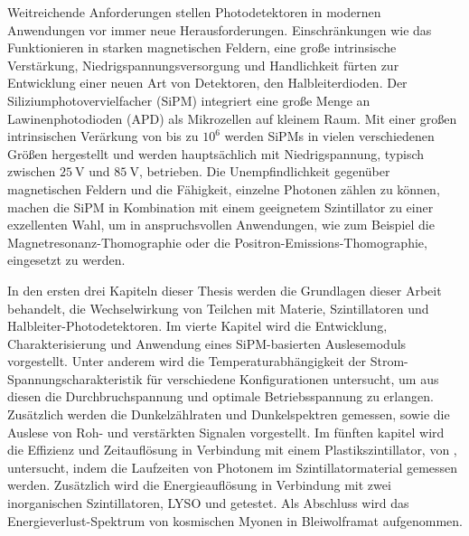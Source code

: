 Weitreichende Anforderungen stellen Photodetektoren in modernen Anwendungen vor immer neue Herausforderungen. Einschr{\"a}nkungen wie das Funktionieren in starken magnetischen Feldern, eine gro\ss e intrinsische Verst{\"a}rkung, Niedrigspannungsversorgung und Handlichkeit f{\"u}rten zur Entwicklung einer neuen Art von Detektoren, den Halbleiterdioden. Der Siliziumphotovervielfacher (SiPM) integriert eine gro\ss e Menge an Lawinenphotodioden (APD) als Mikrozellen auf kleinem Raum. Mit einer gro\ss en intrinsischen Ver{\"a}rkung von bis zu $10^{6}$ werden SiPMs in vielen verschiedenen Gr{\"o}\ss en hergestellt und werden haupts{\"a}chlich mit Niedrigspannung, typisch zwischen $\SI{25}{\volt}$ und $\SI{85}{\volt}$, betrieben. Die Unempfindlichkeit gegen{\"u}ber magnetischen Feldern und die F{\"a}higkeit, einzelne Photonen z{\"a}hlen zu k{\"o}nnen, machen die SiPM in Kombination mit einem geeignetem Szintillator zu einer exzellenten Wahl, um in anspruchsvollen Anwendungen, wie zum Beispiel die Magnetresonanz-Thomographie oder die Positron-Emissions-Thomographie, eingesetzt zu werden. \par
In den ersten drei Kapiteln dieser Thesis werden die Grundlagen dieser Arbeit behandelt, die Wechselwirkung von Teilchen mit Materie, Szintillatoren und Halbleiter-Photodetektoren. Im vierte Kapitel wird die Entwicklung, Charakterisierung und Anwendung eines SiPM-basierten Auslesemoduls vorgestellt. Unter anderem wird die Tem\-pe\-ra\-tur\-ab\-h{\"a}n\-gig\-keit der Strom-Spannungscharakteristik f{\"u}r verschiedene Konfigurationen untersucht, um aus diesen die Durchbruchspannung und optimale Betriebsspannung zu erlangen. Zus{\"a}tzlich werden die Dun\-kel\-z{\"a}hl\-ra\-ten und Dunkelspektren gemessen, sowie die Auslese von Roh- und verst{\"a}rkten Signalen vorgestellt. Im f{\"u}nften kapitel wird die Effizienz und Zeitaufl{\"o}sung in Verbindung mit einem Plastikszintillator,  von , untersucht, indem die Laufzeiten von Photonem im Szintillatormaterial gemessen werden. Zus{\"a}tzlich wird die E\-ner\-gie\-auf\-l{\"o}\-sung in Verbindung mit zwei inorganischen Szintillatoren, LYSO und \pwo{} getestet. Als Abschluss wird das Energieverlust-Spektrum von kosmischen Myonen in Bleiwolframat aufgenommen.
















